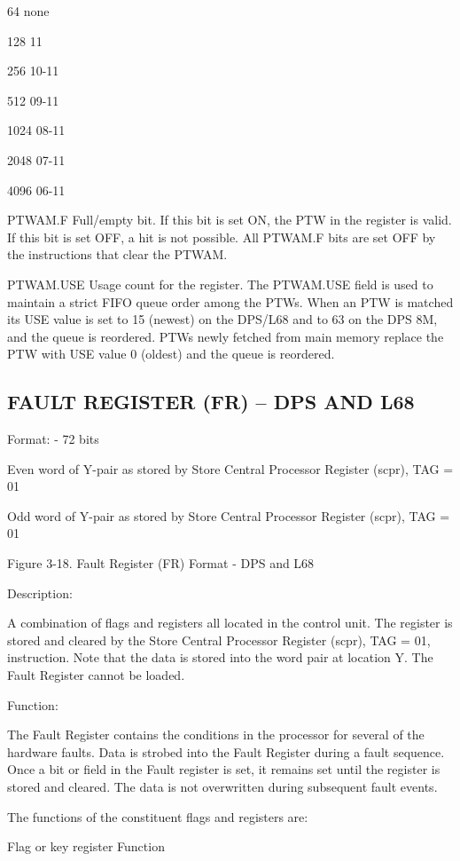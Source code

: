 64 none

128 11

256 10-11

512 09-11

1024 08-11

2048 07-11

4096 06-11

PTWAM.F Full/empty bit. If this bit is set ON, the PTW in the register is
valid. If this bit is set OFF, a hit is not possible. All PTWAM.F bits are set
OFF by the instructions that clear the PTWAM.

PTWAM.USE Usage count for the register. The PTWAM.USE field is used to maintain
a strict FIFO queue order among the PTWs. When an PTW is matched its USE value
is set to 15 (newest) on the DPS/L68 and to 63 on the DPS 8M, and the queue is
reordered. PTWs newly fetched from main memory replace the PTW with USE value 0
(oldest) and the queue is reordered.

\subsection{FAULT REGISTER (FR) -- DPS AND L68}

Format: - 72 bits

Even word of Y-pair as stored by Store Central Processor Register (scpr), TAG = 01

Odd word of Y-pair as stored by Store Central Processor Register (scpr), TAG = 01

Figure 3-18. Fault Register (FR) Format - DPS and L68

Description:

A combination of flags and registers all located in the control unit. The
register is stored and cleared by the Store Central Processor Register (scpr),
TAG = 01, instruction. Note that the data is stored into the word pair at
location Y. The Fault Register cannot be loaded.

Function:

The Fault Register contains the conditions in the processor for several of the
hardware faults. Data is strobed into the Fault Register during a fault
sequence. Once a bit or field in the Fault register is set, it remains set
until the register is stored and cleared. The data is not overwritten during
subsequent fault events.

The functions of the constituent flags and registers are:

Flag or key register Function

